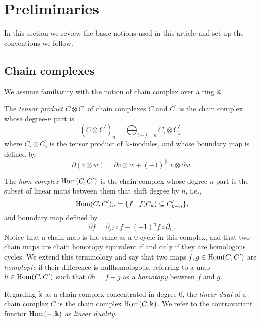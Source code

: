 
\section{Preliminaries} \label{s:preliminaries}

In this section we review the basic notions used in this article and set up the conventions we follow.

\subsection{Chain complexes}

We assume familiarity with the notion of chain complex over a ring $\Bbbk$.

The \textit{tensor product} $C \otimes C^\prime$ of chain complexes $C$ and $C^\prime$ is the chain complex whose degree-$n$ part is
\begin{equation*}
\left(C \otimes C^\prime\right)_n = \bigoplus_{i+j=n} C_i \otimes C^\prime_j,
\end{equation*}
where $C_i \otimes C^\prime_j$ is the tensor product of $\Bbbk$-modules, and whose boundary map is defined by
\begin{equation*}
\partial (v \otimes w) = \partial v \otimes w + (-1)^{|v|} v \otimes \partial w.
\end{equation*}

The \textit{hom complex} $\mathrm{Hom}(C, C^\prime)$ is the chain complex whose degree-$n$ part is the subset of linear maps between them that shift degree by $n$, i.e.,
\begin{equation*}
\mathrm{Hom}(C, C^\prime)_n = \{f \mid f(C_k) \subseteq C^\prime_{k+n}\},
\end{equation*}
and boundary map defined by
\begin{equation*}
\partial f = \partial_{C^\prime} \circ f - (-1)^{n} f \circ \partial_C.
\end{equation*} 
Notice that a chain map is the same as a $0$-cycle in this complex, and that two chain maps are chain homotopy equivalent if and only if they are homologous cycles.
We extend this terminology and say that two maps $f, g \in \mathrm{Hom}(C, C^\prime)$ are \textit{homotopic} if their difference is nullhomologous, referring to a map $h \in \mathrm{Hom}(C, C^\prime)$ such that $\partial h = f - g$ as a \textit{homotopy} between $f$ and $g$.

Regarding $\Bbbk$ as a chain complex concentrated in degree $0$, the \textit{linear dual} of a chain complex $C$ is the chain complex $\mathrm{Hom}(C, \Bbbk)$.
We refer to the contravariant functor $\mathrm{Hom}(-, \Bbbk)$ as \textit{linear duality}.

